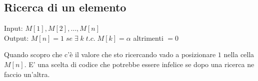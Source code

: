 \newpage


\subsection{Ricerca di un elemento}
Input: $M[1], M[2], \dots , M[n]$\\
Output: $M[n] = 1\; se\; \exists\; k \; t.c. \; M[k] = \alpha$ altrimenti $= 0$

Quando scopro che c'è il valore che sto ricercando vado a posizionare $1$ nella cella $M[n]$. E' una scelta di codice che potrebbe essere infelice se dopo una ricerca ne faccio un'altra.

